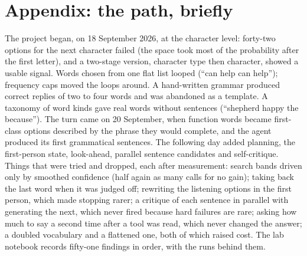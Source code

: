 \documentclass[10pt,twocolumn]{article}
\newcommand{\jev}[1]{``\textsf{#1}''}
\begin{document}
\section*{Appendix: the path, briefly}
{\small\color{black!75}
The project began, on 18 September 2026, at the character level: forty-two options for the next
character failed (the space took most of the probability after the first letter), and a two-stage
version, character type then character, showed a usable signal. Words
chosen from one flat list looped (\jev{can help can help}); frequency caps moved the loops around. A
hand-written grammar produced correct replies of two to four words and was abandoned as a template. A taxonomy
of word kinds gave real words without sentences (\jev{shepherd happy the because}). The turn came on
20 September, when function words became first-class options described by the phrase they would
complete, and the agent produced its first grammatical sentences. The following day added planning,
the first-person state, look-ahead, parallel sentence candidates and self-critique. Things that were
tried and dropped, each after measurement: search bands driven only by smoothed confidence (half
again as many calls for no gain); taking back the last word when it was judged off; rewriting the
listening options in the first person, which made stopping rarer; a critique of each sentence in
parallel with generating the next, which never fired because hard failures are rare; asking how
much to say a second time after a tool was read, which never changed the answer; a doubled
vocabulary and a flattened one, both of which raised cost. The lab notebook records fifty-one
findings in order, with the runs behind them.
}

{\small


}
\end{document}
